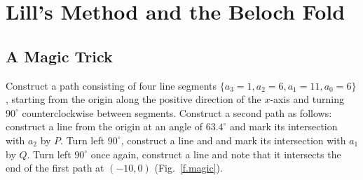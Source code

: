 

\chapter{Lill's Method and the Beloch Fold}\label{c.origami-cube}






\section{A Magic Trick}\label{s.magic}

Construct a path consisting of four line segments $\{a_3=1,a_2=6,a_1=11,a_0=6\}$, starting from the origin along the positive direction of the $x$-axis and turning $90^\circ$ counterclockwise between segments. Construct a second path as follows: construct a line from the origin at an angle of $63.4^\circ$ and mark its intersection with $a_2$ by $P$. Turn left $90^\circ$, construct a line and and mark its intersection with $a_1$ by $Q$. Turn left $90^\circ$ once again, construct a line and note that it intersects the end of the first path at $(-10,0)$   (Fig.~\ref{f.magic}).

